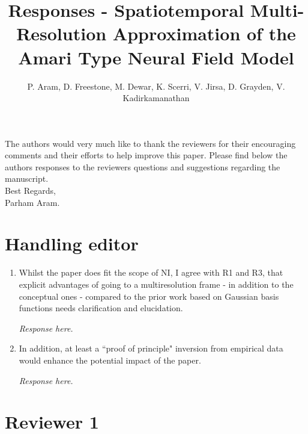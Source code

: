 \documentclass{article}
\title{Responses - Spatiotemporal Multi-Resolution Approximation of the Amari Type Neural Field Model}
\author{ P. Aram, D. Freestone, M. Dewar, K. Scerri, V. Jirsa, D. Grayden, V. Kadirkamanathan}
\begin{document}
    \maketitle

    The authors would very much like to thank the reviewers for their encouraging comments and their efforts to help improve this paper. Please find below the authors responses to the reviewers questions and suggestions regarding the manuscript. 
\\

Best Regards,
\\

Parham Aram.

\section{Handling editor}
\begin{enumerate}
\item Whilst the paper does fit the scope of NI, I agree with R1 and R3, that explicit advantages of going to a multiresolution frame - in addition to the conceptual ones - compared to the prior work based on Gaussian basis functions needs clarification and elucidation. 

\emph{Response here.}

\item  In addition, at least a ``proof of principle" inversion from empirical data would enhance the potential impact of the paper. 

\emph{Response here.}
	
\end{enumerate}

    \section{Reviewer 1}
    
\end{document}
